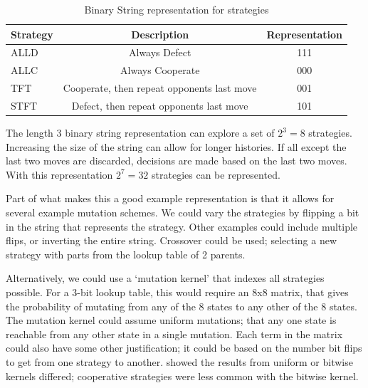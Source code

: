 \documentclass[a4paper,11pt,bcshonoursthesis,singlespace,oneside,thesisdraft,pdflatex]{cssethesis}
\begin{document}
\begin{table}[h]
\centering
\captionsetup{justification=centering}
\begin{tabular}{|l|c|c|}
\hline
 Strategy & Description & Representation\\
\hline
ALLD & Always Defect & 111\\
\hline
ALLC & Always Cooperate & 000\\
\hline
TFT & Cooperate, then repeat opponents last move & 001\\
\hline
STFT & Defect, then repeat opponents last move & 101\\
\hline
\end{tabular}
\caption{Binary String representation for strategies}
\label{table:binaryStrategy}
\end{table}

The length 3 binary string representation can explore a set of $2^3=8$ strategies. Increasing the size of the string can allow for longer histories. 
If all except the last two moves are discarded, decisions are made based on the last two moves. 
With this representation $2^7=32$ strategies can be represented. 

Part of what makes this a good example representation is that it allows for several example mutation schemes. 
We could vary the strategies by flipping a bit in the string that represents the strategy. 
Other examples could include multiple flips, or inverting the entire string. 
Crossover could be used; selecting a new strategy with parts from the lookup table of 2 parents.

Alternatively, we could use a `mutation kernel' that indexes all strategies possible. 
For a 3-bit lookup table, this would require an 8x8 matrix, that gives the probability of mutating from any of the 8 states to any other of the 8 states. 
The mutation kernel could assume uniform mutations; that any one state is reachable from any other state in a single mutation. 
Each term in the matrix could also have some other justification; it could be based on the number bit flips to get from one strategy to another. 
\citet{garcia:PLoSOne:2012} showed the results from uniform or bitwise kernels differed; cooperative strategies were less common with the bitwise kernel. 

\end{document}
